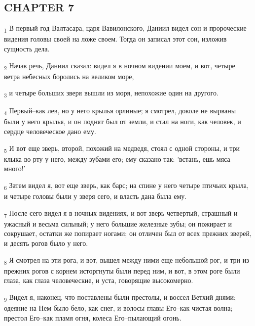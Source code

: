 \subsection{CHAPTER 7}
\begin{tcolorbox}
\textsubscript{1} В первый год Валтасара, царя Вавилонского, Даниил видел сон и пророческие видения головы своей на ложе своем. Тогда он записал этот сон, изложив сущность дела.
\end{tcolorbox}
\begin{tcolorbox}
\textsubscript{2} Начав речь, Даниил сказал: видел я в ночном видении моем, и вот, четыре ветра небесных боролись на великом море,
\end{tcolorbox}
\begin{tcolorbox}
\textsubscript{3} и четыре больших зверя вышли из моря, непохожие один на другого.
\end{tcolorbox}
\begin{tcolorbox}
\textsubscript{4} Первый--как лев, но у него крылья орлиные; я смотрел, доколе не вырваны были у него крылья, и он поднят был от земли, и стал на ноги, как человек, и сердце человеческое дано ему.
\end{tcolorbox}
\begin{tcolorbox}
\textsubscript{5} И вот еще зверь, второй, похожий на медведя, стоял с одной стороны, и три клыка во рту у него, между зубами его; ему сказано так: 'встань, ешь мяса много!'
\end{tcolorbox}
\begin{tcolorbox}
\textsubscript{6} Затем видел я, вот еще зверь, как барс; на спине у него четыре птичьих крыла, и четыре головы были у зверя сего, и власть дана была ему.
\end{tcolorbox}
\begin{tcolorbox}
\textsubscript{7} После сего видел я в ночных видениях, и вот зверь четвертый, страшный и ужасный и весьма сильный; у него большие железные зубы; он пожирает и сокрушает, остатки же попирает ногами; он отличен был от всех прежних зверей, и десять рогов было у него.
\end{tcolorbox}
\begin{tcolorbox}
\textsubscript{8} Я смотрел на эти рога, и вот, вышел между ними еще небольшой рог, и три из прежних рогов с корнем исторгнуты были перед ним, и вот, в этом роге были глаза, как глаза человеческие, и уста, говорящие высокомерно.
\end{tcolorbox}
\begin{tcolorbox}
\textsubscript{9} Видел я, наконец, что поставлены были престолы, и воссел Ветхий днями; одеяние на Нем было бело, как снег, и волосы главы Его--как чистая волна; престол Его--как пламя огня, колеса Его--пылающий огонь.
\end{tcolorbox}
